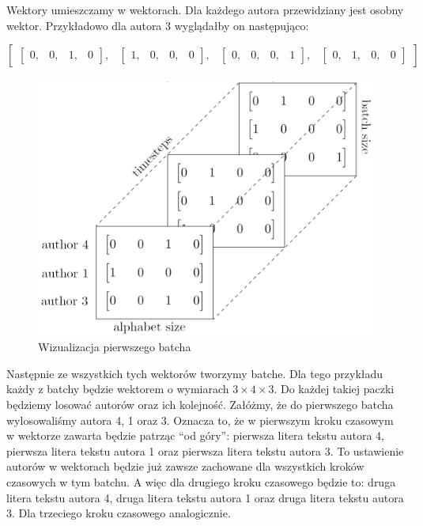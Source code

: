 Wektory umieszczamy w wektorach. Dla każdego autora przewidziany jest osobny wektor. 
Przykładowo dla autora 3 wyglądałby on następująco:
\vspace{3mm}

$
\begin{bmatrix} \begin{bmatrix} 0, & 0, & 1, & 0\end{bmatrix},  & \begin{bmatrix} 1, & 0, & 0, & 0\end{bmatrix}, & \begin{bmatrix} 0, & 0, & 0, & 1\end{bmatrix}, & \begin{bmatrix} 0, & 1, & 0, & 0\end{bmatrix} \end{bmatrix}
$



\begin{figure}
\vspace{-4mm}
\includegraphics[width=\linewidth]{./images/batch.png}
\caption{Wizualizacja pierwszego batcha}
\label{fig:test2}
\vspace{-4mm}
\end{figure}
\vspace{4mm}
Następnie ze wszystkich tych wektorów tworzymy batche.
Dla tego przykładu każdy z batchy będzie wektorem o wymiarach $3 \times 4 \times 3$.
Do każdej takiej paczki będziemy losować autorów oraz ich kolejność. Załóżmy, że do pierwszego batcha
wylosowaliśmy autora 4, 1 oraz 3. Oznacza to, że w pierwszym kroku czasowym w wektorze zawarta będzie 
patrząc ``od góry'': pierwsza litera tekstu autora 4, pierwsza litera tekstu autora 1 oraz pierwsza litera tekstu autora 3.
To ustawienie autorów w wektorach będzie już zawsze zachowane dla wszystkich kroków czasowych w tym batchu. 
A więc dla drugiego kroku czasowego będzie to: druga litera tekstu autora 4, druga litera tekstu autora 1 oraz druga 
litera tekstu autora 3. Dla trzeciego kroku czasowego analogicznie. 

